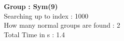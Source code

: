 \textbf{Group : Sym(9)}\\
Searching up to index : 1000\\
How many normal groups are found : 2\\
Total Time in s : 1.4\\
